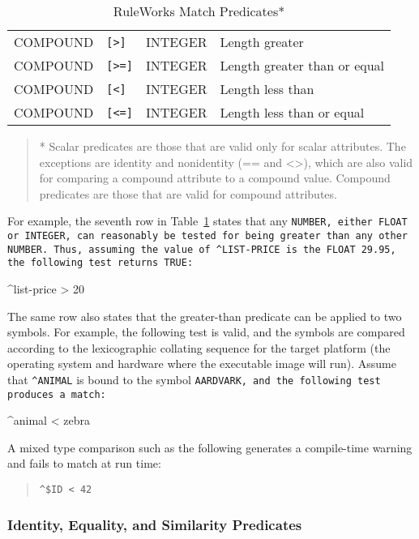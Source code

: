 \begin{table}[!h]
\begin{tabularx}{\columnwidth}{lllX}
    COMPOUND & \verb|[>]| & INTEGER & Length greater \\
    COMPOUND & \verb|[>=]| & INTEGER & Length greater than or equal \\
    COMPOUND & \verb|[<]| & INTEGER & Length less than \\
    COMPOUND & \verb|[<=]| & INTEGER & Length less than or equal \\
    \bottomrule
  \end{tabularx}
\begin{quote}
  * Scalar predicates are those that are valid only for scalar
  attributes. The exceptions are identity and nonidentity (== and <>),
  which are also valid for comparing a compound attribute to a
  compound value.  Compound predicates are those that are valid for
  compound attributes.
\end{quote}
\caption{RuleWorks Match Predicates*}
\label{t:3-2}
\end{table}


For example, the seventh row in Table~\ref{t:3-2} states that any
\tt{NUMBER}, either \tt{FLOAT} or \tt{INTEGER}, can reasonably be
tested for being greater than any other NUMBER. Thus, assuming the
value of \verb|^LIST-PRICE| is the \verb|FLOAT| 29.95, the following
test returns \verb|TRUE|:
\begin{qv}
^list-price > 20
\end{qv}
The same row also states that the greater-than predicate can be
applied to two symbols. For example, the following test is valid, and
the symbols are compared according to the lexicographic collating
sequence for the target platform (the operating system and hardware
where the executable image will run). Assume that \verb|^ANIMAL| is
bound to the symbol \tt{AARDVARK}, and the following test produces a
match:
\begin{qv}
^animal < zebra
\end{qv}

A mixed type comparison such as the following generates a compile-time
warning and fails to match at run time:
\begin{quote}
\begin{verbatim}
^$ID < 42
\end{verbatim}
\end{quote}

\subsubsection*{Identity, Equality, and Similarity Predicates}


